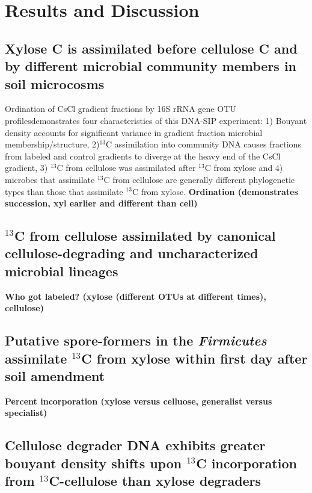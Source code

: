 \section{Results and Discussion}

\subsection{Xylose C is assimilated before cellulose C and by different microbial community members in soil microcosms}
Ordination of CsCl gradient fractions by 16S rRNA gene OTU profilesdemonstrates four characteristics of this DNA-SIP experiment: 1) Bouyant density accounts for significant variance in gradient fraction microbial membership/structure, 2)$^{13}$C assimilation into community DNA causes fractions from labeled and control gradients to diverge at the heavy end of the CsCl gradient, 3) $^{13}$C from cellulose was assimilated after $^{13}$C from xylose and 4) microbes that assimilate $^{13}$C from cellulose are generally different phylogenetic types than those that assimilate $^{13}$C from xylose.  \textbf{Ordination (demonstrates succession, xyl earlier and different than cell)}

\subsection{$^{13}$C from cellulose assimilated by canonical cellulose-degrading and uncharacterized microbial lineages}
\textbf{Who got labeled? (xylose (different OTUs at different times), cellulose)}

\subsection{Putative spore-formers in the \textit{Firmicutes} assimilate $^{13}$C from xylose within first day after soil amendment}
\textbf{Percent incorporation (xylose versus celluose, generalist versus specialist)}

\subsection{Cellulose degrader DNA exhibits greater bouyant density shifts upon $^{13}$C incorporation from $^{13}$C-cellulose than xylose degraders} 

